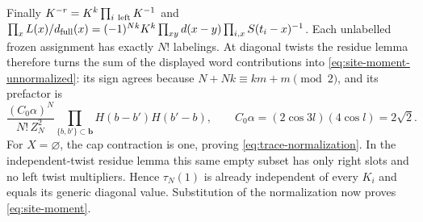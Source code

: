 Finally \(K^{-r}=K^k\prod_{i\ {\rm left}} K^{-1}\) and
\(\prod_x L(x)/d_{\rm full}(x)=(-1)^{Nk}K^k\prod_{xy}d(x-y)\prod_{i,x}S(t_i-x)^{-1}\).
Each unlabelled frozen assignment has exactly \(N!\) labelings. At diagonal twists the residue lemma therefore turns the sum of the displayed word contributions into \eqref{eq:site-moment-unnormalized}: its sign agrees because \(N+Nk\equiv km+m\pmod2\), and its prefactor is
\[
 \frac{(C_0\alpha)^N}{N!\,Z_N^2}
 \prod_{\{b,b'\}\subset\mathbf b}H(b-b')H(b'-b),
 \qquad C_0\alpha=(2\cos3l)(4\cos l)=2\sqrt2.
\]
For \(X=\varnothing\), the cap contraction is one, proving \eqref{eq:trace-normalization}. In the independent-twist residue lemma this same empty subset has only right slots and no left twist multipliers. Hence \(\tau_N(1)\) is already independent of every \(K_i\) and equals its generic diagonal value. Substitution of the normalization now proves \eqref{eq:site-moment}.
